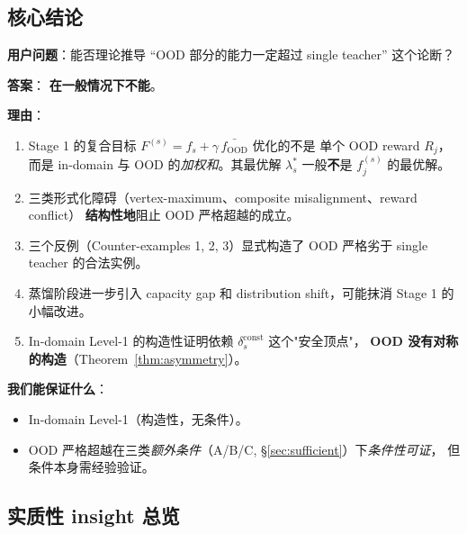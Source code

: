 \documentclass[11pt,a4paper]{article}
\newcommand{\OOD}{\mathrm{OOD}}
\newcommand{\const}{\mathrm{const}}
\theoremstyle{definition}
\begin{document}
\subsection{核心结论}

\begin{tcolorbox}[colback=yellow!5,colframe=yellow!60!black,title=\textbf{对用户问题的直接回答}]
\textbf{用户问题}：能否理论推导 ``OOD 部分的能力一定超过 single teacher'' 这个论断？

\textbf{答案}： \textbf{在一般情况下不能}。

\textbf{理由}：
\begin{enumerate}[leftmargin=1.5em]
\item Stage 1 的复合目标 $F^{(s)} = f_s + \gamma\,\bar{f_{\OOD}}$ 优化的不是
单个 OOD reward $R_j$，而是 in-domain 与 OOD 的\emph{加权和}。其最优解
$\lambda_s^*$ 一般\textbf{不}是 $f_j^{(s)}$ 的最优解。
\item 三类形式化障碍（vertex-maximum、composite misalignment、reward conflict）
\textbf{结构性地}阻止 OOD 严格超越的成立。
\item 三个反例（Counter-examples 1, 2, 3）显式构造了 OOD 严格劣于 single
teacher 的合法实例。
\item 蒸馏阶段进一步引入 capacity gap 和 distribution shift，可能抹消 Stage 1
的小幅改进。
\item In-domain Level-1 的构造性证明依赖 $\delta_s^\const$ 这个"安全顶点"，
\textbf{OOD 没有对称的构造}（Theorem~\ref{thm:asymmetry}）。
\end{enumerate}

\textbf{我们能保证什么}：
\begin{itemize}[leftmargin=1.5em]
\item In-domain Level-1（构造性，无条件）。
\item OOD 严格超越在三类\emph{额外条件}（A/B/C, \S\ref{sec:sufficient}）下\emph{条件性可证}，
但条件本身需经验验证。
\end{itemize}
\end{tcolorbox}

\subsection{实质性 insight 总览}
\end{document}
